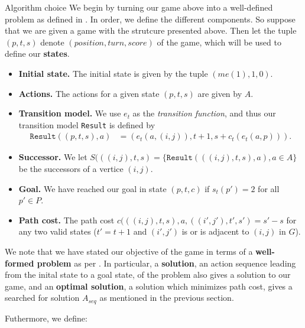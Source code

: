 \begin{section}{Algorithm choice}
  We begin by turning our game above into a well-defined problem as defined in \cite{rn}. In order, we define the different components. So suppose that we are given a game with the strutcure presented above. Then let the tuple $(p, t, s)$ denote $(position, turn, score)$ of the game, which will be used to define our \textbf{states}.

  \begin{itemize}
  \item \textbf{Initial state.} The initial state is given by the tuple $(me(1), 1, 0)$.

  \item \textbf{Actions.} The actions for a given state $(p, t, s)$ are given by $A$.

  \item \textbf{Transition model.} We use $e_t$ as the \textit{transition function}, and thus our transition model \texttt{Result} is defined by
    \begin{equation*}
      \begin{split}
        \texttt{Result}( (p, t, s), a ) &= ( e_t(a, (i,j)),
        t+1, s+c_t(e_t(a, p))).
      \end{split}
    \end{equation*}

    
  \item \textbf{Successor.} We let $S(((i, j), t, s) = \{\texttt{Result}(((i,j), t, s), a), a\in A \}$ be the successors of a vertice $(i, j)$.

  \item \textbf{Goal.} We have reached our goal in state $(p, t, c)$ if $s_t(p') = 2$ for all $p' \in P$.

  \item \textbf{Path cost.} The path cost $c(((i,j),t,s), a, ((i',j'),t',s') = s'-s$ for any two valid states ($t' = t+1$ and $(i', j')$ is or is adjacent to $(i, j)$ in $G$). 
\end{itemize}
We note that we have stated our objective of the game in terms of a \textbf{well-formed problem} as per \cite{rn}. In particular, a \textbf{solution}, an action sequence leading from the inital state to a goal state, of the problem also gives a solution to our game, and an \textbf{optimal solution}, a solution which minimizes path cost, gives a searched for solution $A_{seq}$ as mentioned in the previous section. 

Futhermore, we define:
\begin{itemize}
  

\end{itemize}
\end{section}
